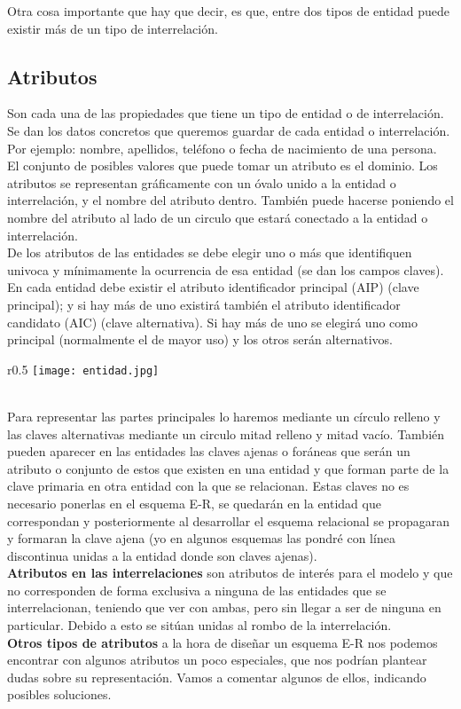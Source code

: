 \documentclass{article}
\begin{document}
Otra cosa importante que hay que decir, es que, entre dos tipos de entidad puede existir más de un tipo de interrelación.
\newpage
\subsection{Atributos}
Son cada una de las propiedades que tiene un tipo de entidad o de interrelación. Se dan los datos concretos que queremos guardar de cada entidad o interrelación. 
Por ejemplo: nombre, apellidos, teléfono o fecha de nacimiento de una persona.
\\
El conjunto de posibles valores que puede tomar un atributo es el dominio. Los atributos se representan gráficamente con un óvalo unido a la entidad o interrelación, 
y el nombre del atributo dentro. También puede hacerse poniendo el nombre del atributo al lado de un circulo que estará conectado a la entidad o interrelación.\\
De los atributos de las entidades se debe elegir uno o más que identifiquen univoca y mínimamente la ocurrencia de esa entidad (se dan los campos claves). 
En cada entidad debe existir el atributo identificador principal (AIP) (clave principal); y si hay más de uno existirá también el atributo identificador candidato 
(AIC) (clave alternativa). Si hay más de uno se elegirá uno como principal (normalmente el de mayor uso) y los otros serán alternativos.
\\
\begin{wrapfigure}{r}{0.5\textwidth}
    \centering
    \texttt{[image: entidad.jpg]}
\end{wrapfigure}
\\
Para representar las partes principales lo haremos mediante un círculo relleno y las claves alternativas mediante un circulo mitad relleno y mitad vacío.
También pueden aparecer en las entidades las claves ajenas o foráneas que serán un atributo o conjunto de estos que existen en una entidad y que forman parte de la clave 
primaria en otra entidad con la que se relacionan. Estas claves no es necesario ponerlas en el esquema E-R, se quedarán en la entidad que correspondan y posteriormente al 
desarrollar el esquema relacional se propagaran y formaran la clave ajena (yo en algunos esquemas las pondré con línea discontinua unidas a la entidad donde son claves ajenas).
\\
\newpage
\textbf{Atributos en las interrelaciones} son atributos de interés para el modelo y que no corresponden de forma exclusiva a ninguna de las entidades que se interrelacionan, 
teniendo que ver con ambas, pero sin llegar a ser de ninguna en particular. Debido a esto se sitúan unidas al rombo de la interrelación.
\\
\textbf{Otros tipos de atributos} a la hora de diseñar un esquema E-R nos podemos encontrar con algunos atributos un poco especiales, que nos podrían plantear dudas sobre su 
representación. Vamos a comentar algunos de ellos, indicando posibles soluciones.
\end{document}
